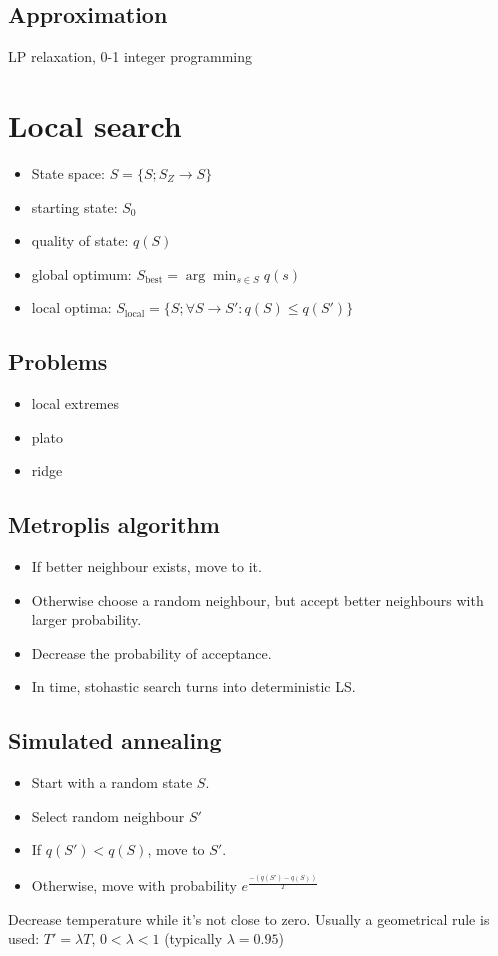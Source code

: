 \begin{multicols}{5}
\subsection{Approximation}
LP relaxation, 0-1 integer programming
\section{Local search}
\begin{itemize}
	\item State space: $S=\{S;S_Z\longrightarrow S\}$
	\item starting state: $S_0$
	\item quality of state: $q(S)$
	\item global optimum: $S_{\text{best}} = \arg \min_{s\in S} q(s)$
	\item local optima: $S_{\text{local}} = \{S;\forall S\rightarrow S\prime : q(S) \leq q(S\prime)\}$
\end{itemize}
\subsection{Problems}
\begin{itemize}
	\item local extremes
	\item plato
	\item ridge
\end{itemize}
\subsection{Metroplis algorithm}
\begin{itemize}
	\item If better neighbour exists, move to it.
	\item Otherwise choose a random neighbour, but accept better neighbours with larger probability.
	\item Decrease the probability of acceptance.
	\item In time, stohastic search turns into deterministic LS.
\end{itemize}
\subsection{Simulated annealing}
\begin{itemize}
	\item Start with a random state $S$.
	\item Select random neighbour $S\prime$
	\item If $q(S\prime) < q(S)$, move to $S\prime$.
	\item Otherwise, move with probability $e^\frac{-(q(S\prime)-q(S))}{T}$
\end{itemize}
Decrease temperature while it's not close to zero.
Usually a geometrical rule is used: $T\prime = \lambda T$, $0<\lambda<1$ (typically $\lambda = 0.95$)

\end{multicols}

